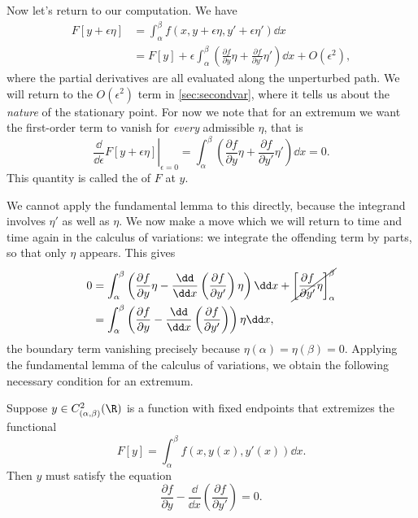\documentclass[a4paper]{scrartcl}
\begin{document}
Now let's return to our computation. We have
\begin{align*}
	F[y + \epsilon \eta] &= \int_{\alpha}^{\beta} f(x, y + \epsilon \eta, y' + \epsilon \eta') \dd x \\
	&= F[y] + \epsilon \int_{\alpha}^{\beta} \left(\frac{\partial f}{\partial y} \eta + \frac{\partial f}{\partial y'} \eta '\right) \dd x + O(\epsilon^2),
\end{align*}
where the partial derivatives are all evaluated along the unperturbed path.
We will return to the $O(\epsilon^2)$ term in \autoref{sec:secondvar}, where it tells us about the \emph{nature} of the stationary point. For now we note that for an extremum we want the first-order term to vanish for \emph{every} admissible $\eta$, that is
$$
\left.\frac{\dd}{\dd \epsilon}F[y + \epsilon \eta]\right|_{\epsilon = 0} = \int_{\alpha}^{\beta}\left(\frac{\partial f}{\partial y}\eta + \frac{\partial f}{\partial y'}\eta'\right)\dd x = 0.
$$
This quantity is called the  of $F$ at $y$.

We cannot apply the fundamental lemma to this directly, because the integrand involves $\eta'$ as well as $\eta$. We now make a move which we will return to time and time again in the calculus of variations: we integrate the offending term by parts, so that only $\eta$ appears. This gives
\begin{align*}
	0 &= \int_{\alpha}^{\beta} \left(\frac{\partial f}{\partial y} \eta - \frac{\dd}{\dd x} \left(\frac{\partial f}{\partial y'}\right) \eta\right) \dd x + \cancel{\left[\frac{\partial f}{\partial y'}\eta\right]_{\alpha}^{\beta}} \\
	&= \int_{\alpha}^{\beta} \left(\frac{\partial f}{\partial y} - \frac{\dd}{\dd x} \left(\frac{\partial f}{\partial y'}\right)\right) \eta \dd x,
\end{align*}
the boundary term vanishing precisely because $\eta(\alpha) = \eta(\beta) = 0$.
Applying the fundamental lemma of the calculus of variations, we obtain the following necessary condition for an extremum.

\begin{theorem}
	Suppose $y \in C^2_{(\alpha, \beta)}(\R)$ is a function with fixed endpoints that extremizes the functional
	$$
	F[y] = \int_{\alpha}^{\beta} f(x, y(x), y'(x)) \dd x.
	$$
	Then $y$ must satisfy the  equation
	\begin{equation}\label{eq:el}
		\frac{\partial f}{\partial y} - \frac{\dd}{\dd x} \left(\frac{\partial f}{\partial y'}\right) = 0. \tag{$\dagger$}
	\end{equation}
\end{theorem}
\end{document}
